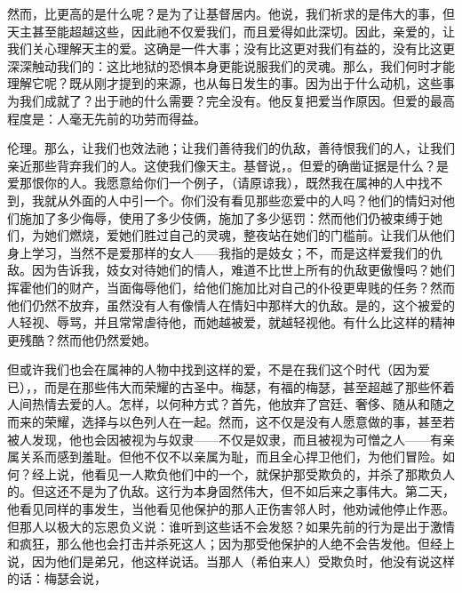 然而，比更高的是什么呢？是为了让基督居内。他说，我们祈求的是伟大的事，但天主甚至能超越这些，因此祂不仅爱我们，而且爱得如此深切。因此，亲爱的，让我们关心理解天主的爱。这确是一件大事；没有比这更对我们有益的，没有比这更深深触动我们的：这比地狱的恐惧本身更能说服我们的灵魂。那么，我们何时才能理解它呢？既从刚才提到的来源，也从每日发生的事。因为出于什么动机，这些事为我们成就了？出于祂的什么需要？完全没有。他反复把爱当作原因。但爱的最高程度是：人毫无先前的功劳而得益。\par

伦理。那么，让我们也效法祂；让我们善待我们的仇敌，善待恨我们的人，让我们亲近那些背弃我们的人。这使我们像天主。基督说，。但爱的确凿证据是什么？是爱那恨你的人。我愿意给你们一个例子，（请原谅我），既然我在属神的人中找不到，我就从外面的人中引一个。你们没有看见那些恋爱中的人吗？他们的情妇对他们施加了多少侮辱，使用了多少伎俩，施加了多少惩罚：然而他们仍被束缚于她们，为她们燃烧，爱她们胜过自己的灵魂，整夜站在她们的门槛前。让我们从他们身上学习，当然不是爱那样的女人——我指的是妓女；不，而是这样爱我们的仇敌。因为告诉我，妓女对待她们的情人，难道不比世上所有的仇敌更傲慢吗？她们挥霍他们的财产，当面侮辱他们，给他们施加比对自己的仆役更卑贱的任务？然而他们仍然不放弃，虽然没有人有像情人在情妇中那样大的仇敌。是的，这个被爱的人轻视、辱骂，并且常常虐待他，而她越被爱，就越轻视他。有什么比这样的精神更残酷？然而他仍然爱她。\par

但或许我们也会在属神的人物中找到这样的爱，不是在我们这个时代（因为爱已），，而是在那些伟大而荣耀的古圣中。梅瑟，有福的梅瑟，甚至超越了那些怀着人间热情去爱的人。怎样，以何种方式？首先，他放弃了宫廷、奢侈、随从和随之而来的荣耀，选择与以色列人在一起。然而，这不仅是没有人愿意做的事，甚至若被人发现，他也会因被视为与奴隶——不仅是奴隶，而且被视为可憎之人——有亲属关系而感到羞耻。但他不仅不以亲属为耻，而且全心捍卫他们，为他们冒险。如何？经上说，他看见一人欺负他们中的一个，就保护那受欺负的，并杀了那欺负人的。但这还不是为了仇敌。这行为本身固然伟大，但不如后来之事伟大。第二天，他看见同样的事发生，当他看见他保护的那人正伤害邻人时，他劝诫他停止作恶。但那人以极大的忘恩负义说：谁听到这些话不会发怒？如果先前的行为是出于激情和疯狂，那么他也会打击并杀死这人；因为那受他保护的人绝不会告发他。但经上说，因为他们是弟兄，他这样说话。当那人（希伯来人）受欺负时，他没有说这样的话：梅瑟会说，\par

